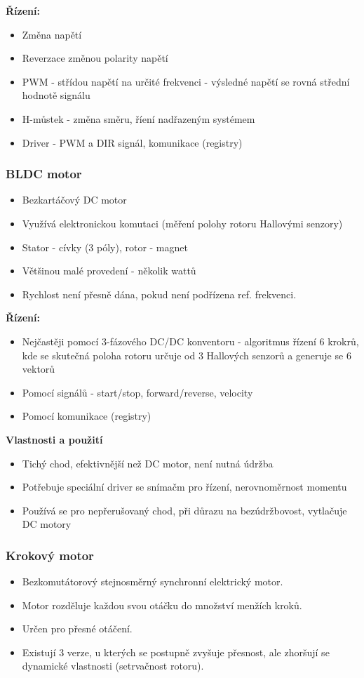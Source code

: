 \textbf{Řízení:}
\begin{itemize}
  \item Změna napětí
  \item Reverzace změnou polarity napětí
  \item PWM - střídou napětí na určité frekvenci - výsledné napětí se rovná střední hodnotě signálu
  \item H-můstek - změna směru, říení nadřazeným systémem
  \item Driver - PWM a DIR signál, komunikace (registry)
\end{itemize}

\subsubsection*{BLDC motor}
\begin{itemize}
  \item Bezkartáčový DC motor
  \item Využívá elektronickou komutaci (měření polohy rotoru Hallovými senzory)
  \item Stator - cívky (3 póly), rotor - magnet
  \item Většinou malé provedení - několik wattů
  \item Rychlost není přesně dána, pokud není podřízena ref. frekvenci.
\end{itemize}

\textbf{Řízení:}
\begin{itemize}
  \item Nejčastěji pomocí 3-fázového DC/DC konventoru - algoritmus řízení 6 krokrů, kde se skutečná poloha rotoru určuje od 3 Hallových senzorů a generuje se 6 vektorů
  \item Pomocí signálů - start/stop, forward/reverse, velocity
  \item Pomocí komunikace (registry)
\end{itemize}

\textbf{Vlastnosti a použití}
\begin{itemize}
  \item Tichý chod, efektivnější než DC motor, není nutná údržba
  \item Potřebuje speciální driver se snímačm pro řízení, nerovnoměrnost momentu
  \item Používá se pro nepřerušovaný chod, při důrazu na bezúdržbovost, vytlačuje DC motory
\end{itemize}

\subsubsection*{Krokový motor}
\begin{itemize}
  \item Bezkomutátorový stejnosměrný synchronní elektrický motor.
  \item Motor rozděluje každou svou otáčku do množství menžích kroků.
  \item Určen pro přesné otáčení.
  \item Existují 3 verze, u kterých se postupně zvyšuje přesnost, ale zhoršují se dynamické vlastnosti (setrvačnost rotoru).
\end{itemize}

